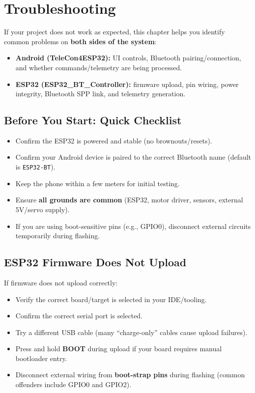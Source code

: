 \chapter{Troubleshooting}
\label{ch:troubleshooting}

If your project does not work as expected, this chapter helps you identify common problems on
\textbf{both sides of the system}:

\begin{itemize}
    \item \textbf{Android (TeleCon4ESP32):} UI controls, Bluetooth pairing/connection, and whether commands/telemetry are being processed.
    \item \textbf{ESP32 (ESP32\_BT\_Controller):} firmware upload, pin wiring, power integrity, Bluetooth SPP link, and telemetry generation.
\end{itemize}

\section{Before You Start: Quick Checklist}
\label{sec:quick-checklist}

\begin{itemize}
    \item Confirm the ESP32 is powered and stable (no brownouts/resets).
    \item Confirm your Android device is paired to the correct Bluetooth name (default is \texttt{ESP32-BT}).
    \item Keep the phone within a few meters for initial testing.
    \item Ensure \textbf{all grounds are common} (ESP32, motor driver, sensors, external 5V/servo supply).
    \item If you are using boot-sensitive pins (e.g., GPIO0), disconnect external circuits temporarily during flashing.
\end{itemize}

\section{ESP32 Firmware Does Not Upload}
\label{sec:esp32-upload}

If firmware does not upload correctly:

\begin{itemize}
    \item Verify the correct board/target is selected in your IDE/tooling.
    \item Confirm the correct serial port is selected.
    \item Try a different USB cable (many ``charge-only'' cables cause upload failures).
    \item Press and hold \textbf{BOOT} during upload if your board requires manual bootloader entry.
    \item Disconnect external wiring from \textbf{boot-strap pins} during flashing (common offenders include GPIO0 and GPIO2).
\end{itemize}

